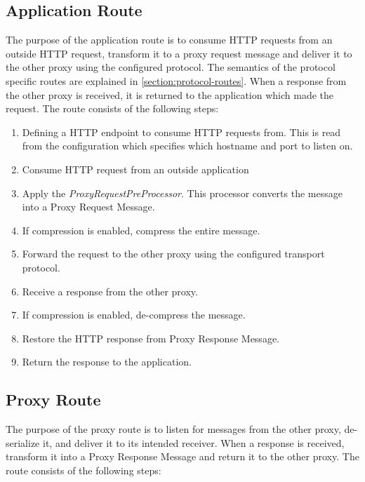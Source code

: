 

\paragraph{}

\subsection{Application Route}

The purpose of the application route is to consume HTTP requests from an outside
HTTP request, transform it to a proxy request message and deliver it to the
other proxy using the configured protocol. The semantics of the protocol
specific routes are explained in \cref{section:protocol-routes}. When a response
from the other proxy is received, it is returned to the application which made
the request. The route consists of the following steps:

\begin{enumerate}
	\item Defining a HTTP endpoint to consume HTTP requests from. This is read from the configuration which specifies which hostname and port to listen on.
	\item Consume HTTP request from an outside application
	\item Apply the \textit{ProxyRequestPreProcessor}. This processor converts the message into a Proxy Request Message.
	\item If compression is enabled, compress the entire message.
	\item Forward the request to the other proxy using the configured transport protocol.
	\item Receive a response from the other proxy.
	\item If compression is enabled, de-compress the message.
	\item Restore the HTTP response from Proxy Response Message.
	\item Return the response to the application.
\end{enumerate}

\subsection{Proxy Route}

The purpose of the proxy route is to listen for messages from the other proxy,
de-serialize it, and deliver it to its intended receiver. When a response is
received, transform it into a Proxy Response Message and return it to the other
proxy. The route consists of the following steps:

